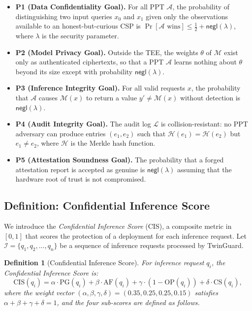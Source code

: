 \documentclass{ieeeaccess}
\newtheorem{definition}{Definition}
\begin{document}
\begin{itemize}
\item \textbf{P1 (Data Confidentiality Goal).} For all PPT $\mathcal{A}$, the probability
of distinguishing two input queries $x_0$ and $x_1$ given only the
observations available to an honest-but-curious CSP is
$\Pr[\mathcal{A} \text{ wins}] \leq \frac{1}{2} + \mathsf{negl}(\lambda)$,
where $\lambda$ is the security parameter.

\item \textbf{P2 (Model Privacy Goal).} Outside the TEE, the weights $\theta$ of
$\mathcal{M}$ exist only as authenticated ciphertexts, so that a PPT
$\mathcal{A}$ learns nothing about $\theta$ beyond its size except with
probability $\mathsf{negl}(\lambda)$.

\item \textbf{P3 (Inference Integrity Goal).} For all valid requests $x$, the
probability that $\mathcal{A}$ causes $\mathcal{M}(x)$ to return a value
$y' \neq \mathcal{M}(x)$ without detection is $\mathsf{negl}(\lambda)$.

\item \textbf{P4 (Audit Integrity Goal).} The audit log $\mathcal{L}$ is
collision-resistant: no PPT adversary can produce entries
$(e_1, e_2)$ such that $\mathcal{H}(e_1) = \mathcal{H}(e_2)$ but
$e_1 \neq e_2$, where $\mathcal{H}$ is the Merkle hash function.

\item \textbf{P5 (Attestation Soundness Goal).} The probability that a forged
attestation report is accepted as genuine is $\mathsf{negl}(\lambda)$ assuming that the hardware root of trust is not compromised.
\end{itemize}

\subsection{Definition: Confidential Inference Score}
\label{subsec:cis}

We introduce the \emph{Confidential Inference Score} (CIS), a composite
metric in $[0,1]$ that scores the protection of a deployment for each
inference request. Let $\mathcal{I} = \{q_1, q_2, \ldots, q_n\}$ be
a sequence of inference requests processed by TwinGuard.

\begin{definition}[Confidential Inference Score]
\label{def:cis}
For inference request $q_i$, the Confidential Inference Score is:
\begin{equation}
\label{eq:cis}
\mathrm{CIS}(q_i) = \alpha \cdot \mathrm{PG}(q_i)
                  + \beta  \cdot \mathrm{AF}(q_i)
                  + \gamma \cdot (1 - \mathrm{OP}(q_i))
                  + \delta \cdot \mathrm{CS}(q_i),
\end{equation}
where the weight vector $(\alpha, \beta, \gamma, \delta) = (0.35, 0.25, 0.25, 0.15)$
satisfies $\alpha + \beta + \gamma + \delta = 1$, and the four sub-scores are
defined as follows.
\end{definition}
\end{document}
